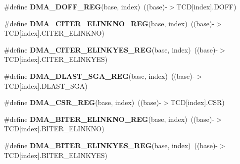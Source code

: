 \begin{DoxyCompactItemize}
\item 
\#define {\bfseries D\+M\+A\+\_\+\+D\+O\+F\+F\+\_\+\+R\+EG}(base,  index)~((base)-\/$>$T\+CD\mbox{[}index\mbox{]}.D\+O\+FF)\hypertarget{group__DMA__Register__Accessor__Macros_ga6d2ec5d178da38a609670b33ca2b4ad8}{}\label{group__DMA__Register__Accessor__Macros_ga6d2ec5d178da38a609670b33ca2b4ad8}

\item 
\#define {\bfseries D\+M\+A\+\_\+\+C\+I\+T\+E\+R\+\_\+\+E\+L\+I\+N\+K\+N\+O\+\_\+\+R\+EG}(base,  index)~((base)-\/$>$T\+CD\mbox{[}index\mbox{]}.C\+I\+T\+E\+R\+\_\+\+E\+L\+I\+N\+K\+NO)\hypertarget{group__DMA__Register__Accessor__Macros_ga6f2b334ee966aaed7d97a12b2f21e990}{}\label{group__DMA__Register__Accessor__Macros_ga6f2b334ee966aaed7d97a12b2f21e990}

\item 
\#define {\bfseries D\+M\+A\+\_\+\+C\+I\+T\+E\+R\+\_\+\+E\+L\+I\+N\+K\+Y\+E\+S\+\_\+\+R\+EG}(base,  index)~((base)-\/$>$T\+CD\mbox{[}index\mbox{]}.C\+I\+T\+E\+R\+\_\+\+E\+L\+I\+N\+K\+Y\+ES)\hypertarget{group__DMA__Register__Accessor__Macros_gaf014ca6b4a7bf454a74811b30aae01e6}{}\label{group__DMA__Register__Accessor__Macros_gaf014ca6b4a7bf454a74811b30aae01e6}

\item 
\#define {\bfseries D\+M\+A\+\_\+\+D\+L\+A\+S\+T\+\_\+\+S\+G\+A\+\_\+\+R\+EG}(base,  index)~((base)-\/$>$T\+CD\mbox{[}index\mbox{]}.D\+L\+A\+S\+T\+\_\+\+S\+GA)\hypertarget{group__DMA__Register__Accessor__Macros_gaaefaeb95e9b7a2fb1199c2f181ac634d}{}\label{group__DMA__Register__Accessor__Macros_gaaefaeb95e9b7a2fb1199c2f181ac634d}

\item 
\#define {\bfseries D\+M\+A\+\_\+\+C\+S\+R\+\_\+\+R\+EG}(base,  index)~((base)-\/$>$T\+CD\mbox{[}index\mbox{]}.C\+SR)\hypertarget{group__DMA__Register__Accessor__Macros_ga194fd4b02627791836763868c2b84261}{}\label{group__DMA__Register__Accessor__Macros_ga194fd4b02627791836763868c2b84261}

\item 
\#define {\bfseries D\+M\+A\+\_\+\+B\+I\+T\+E\+R\+\_\+\+E\+L\+I\+N\+K\+N\+O\+\_\+\+R\+EG}(base,  index)~((base)-\/$>$T\+CD\mbox{[}index\mbox{]}.B\+I\+T\+E\+R\+\_\+\+E\+L\+I\+N\+K\+NO)\hypertarget{group__DMA__Register__Accessor__Macros_gaef38b025993510e86935a83451644087}{}\label{group__DMA__Register__Accessor__Macros_gaef38b025993510e86935a83451644087}

\item 
\#define {\bfseries D\+M\+A\+\_\+\+B\+I\+T\+E\+R\+\_\+\+E\+L\+I\+N\+K\+Y\+E\+S\+\_\+\+R\+EG}(base,  index)~((base)-\/$>$T\+CD\mbox{[}index\mbox{]}.B\+I\+T\+E\+R\+\_\+\+E\+L\+I\+N\+K\+Y\+ES)\hypertarget{group__DMA__Register__Accessor__Macros_ga06fd4f8696355df5a5562f1a9ab75d7b}{}\label{group__DMA__Register__Accessor__Macros_ga06fd4f8696355df5a5562f1a9ab75d7b}


\end{DoxyCompactItemize}
